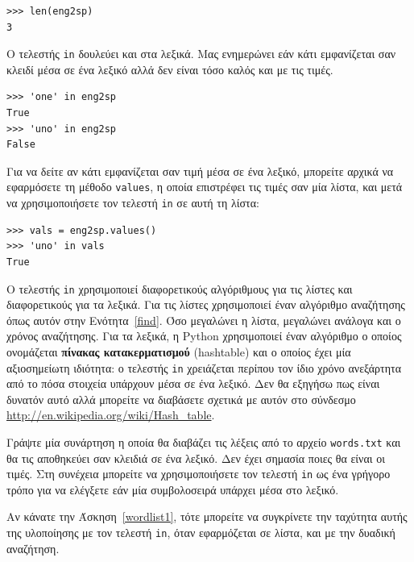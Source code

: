 \documentclass[10pt]{book}
\begin{document}
\begin{verbatim}
>>> len(eng2sp)
3
\end{verbatim}
%
Ο τελεστής {\tt in} δουλεύει και στα λεξικά. Μας ενημερώνει εάν κάτι εμφανίζεται σαν κλειδί μέσα σε ένα λεξικό αλλά δεν είναι τόσο καλός και με τις τιμές. 

\begin{verbatim}
>>> 'one' in eng2sp
True
>>> 'uno' in eng2sp
False
\end{verbatim}
%
Για να δείτε αν κάτι εμφανίζεται σαν τιμή μέσα σε ένα λεξικό, μπορείτε αρχικά να εφαρμόσετε τη μέθοδο {\tt values}, η οποία επιστρέφει τις τιμές σαν μία λίστα, και μετά να χρησιμοποιήσετε τον τελεστή {\tt in} σε αυτή τη λίστα:

\begin{verbatim}
>>> vals = eng2sp.values()
>>> 'uno' in vals
True
\end{verbatim}
%
Ο τελεστής {\tt in} χρησιμοποιεί διαφορετικούς αλγόριθμους για τις λίστες και διαφορετικούς για τα λεξικά. Για τις λίστες χρησιμοποιεί έναν αλγόριθμο αναζήτησης όπως αυτόν στην Ενότητα~\ref{find}. Όσο μεγαλώνει η λίστα, μεγαλώνει ανάλογα και ο χρόνος αναζήτησης. Για τα λεξικά, η Python χρησιμοποιεί έναν αλγόριθμο ο οποίος ονομάζεται {\bf πίνακας κατακερματισμού} (hashtable) και ο οποίος έχει μία αξιοσημείωτη ιδιότητα: ο τελεστής {\tt in} χρειάζεται περίπου τον ίδιο χρόνο ανεξάρτητα από το πόσα στοιχεία υπάρχουν μέσα σε ένα λεξικό. Δεν θα εξηγήσω πως είναι δυνατόν αυτό αλλά μπορείτε να διαβάσετε σχετικά με αυτόν στο σύνδεσμο \url{http://en.wikipedia.org/wiki/Hash_table}.
\\

\begin{exercise}
\label{wordlist2}

Γράψτε μία συνάρτηση η οποία θα διαβάζει τις λέξεις από το αρχείο {\tt words.txt} και θα τις αποθηκεύει σαν κλειδιά σε ένα λεξικό. Δεν έχει σημασία ποιες θα είναι οι τιμές. Στη συνέχεια μπορείτε να χρησιμοποιήσετε τον τελεστή  
{\tt in} ως ένα γρήγορο τρόπο για να ελέγξετε εάν μία συμβολοσειρά υπάρχει μέσα στο λεξικό.

Αν κάνατε την Άσκηση~\ref{wordlist1}, τότε μπορείτε να συγκρίνετε την ταχύτητα αυτής της υλοποίησης με τον τελεστή {\tt in}, όταν εφαρμόζεται σε λίστα, και με  την δυαδική αναζήτηση.
\end{exercise}
\end{document}
